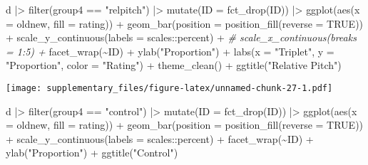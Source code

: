 \documentclass[
  man,floatsintext]{apa7}
\newenvironment{Shaded}{\begin{snugshade}}{\end{snugshade}}
\newcommand{\AttributeTok}[1]{\textcolor[rgb]{0.77,0.63,0.00}{#1}}
\newcommand{\CommentTok}[1]{\textcolor[rgb]{0.56,0.35,0.01}{\textit{#1}}}
\newcommand{\ConstantTok}[1]{\textcolor[rgb]{0.00,0.00,0.00}{#1}}
\newcommand{\FunctionTok}[1]{\textcolor[rgb]{0.00,0.00,0.00}{#1}}
\newcommand{\NormalTok}[1]{#1}
\newcommand{\SpecialCharTok}[1]{\textcolor[rgb]{0.00,0.00,0.00}{#1}}
\newcommand{\StringTok}[1]{\textcolor[rgb]{0.31,0.60,0.02}{#1}}
\begin{document}
\begin{Shaded}
\begin{Highlighting}[]
\NormalTok{d }\SpecialCharTok{|\textgreater{}}
  \FunctionTok{filter}\NormalTok{(group4 }\SpecialCharTok{==} \StringTok{"relpitch"}\NormalTok{) }\SpecialCharTok{|\textgreater{}}
  \FunctionTok{mutate}\NormalTok{(}\AttributeTok{ID =} \FunctionTok{fct\_drop}\NormalTok{(ID)) }\SpecialCharTok{|\textgreater{}}
  \FunctionTok{ggplot}\NormalTok{(}\FunctionTok{aes}\NormalTok{(}\AttributeTok{x =}\NormalTok{ oldnew, }\AttributeTok{fill =}\NormalTok{ rating)) }\SpecialCharTok{+}
  \FunctionTok{geom\_bar}\NormalTok{(}\AttributeTok{position =} \FunctionTok{position\_fill}\NormalTok{(}\AttributeTok{reverse =} \ConstantTok{TRUE}\NormalTok{)) }\SpecialCharTok{+}
  \FunctionTok{scale\_y\_continuous}\NormalTok{(}\AttributeTok{labels =}\NormalTok{ scales}\SpecialCharTok{::}\NormalTok{percent) }\SpecialCharTok{+}
  \CommentTok{\# scale\_x\_continuous(breaks = 1:5) +}
  \FunctionTok{facet\_wrap}\NormalTok{(}\SpecialCharTok{\textasciitilde{}}\NormalTok{ID) }\SpecialCharTok{+}
  \FunctionTok{ylab}\NormalTok{(}\StringTok{"Proportion"}\NormalTok{) }\SpecialCharTok{+}
  \FunctionTok{labs}\NormalTok{(}\AttributeTok{x =} \StringTok{"Triplet"}\NormalTok{, }\AttributeTok{y =} \StringTok{"Proportion"}\NormalTok{, }\AttributeTok{color =} \StringTok{"Rating"}\NormalTok{) }\SpecialCharTok{+}
  \FunctionTok{theme\_clean}\NormalTok{() }\SpecialCharTok{+}
  \FunctionTok{ggtitle}\NormalTok{(}\StringTok{"Relative Pitch"}\NormalTok{)}
\end{Highlighting}
\end{Shaded}

\texttt{[image: supplementary\_files/figure-latex/unnamed-chunk-27-1.pdf]}

\begin{Shaded}
\begin{Highlighting}[]
\NormalTok{d }\SpecialCharTok{|\textgreater{}}
  \FunctionTok{filter}\NormalTok{(group4 }\SpecialCharTok{==} \StringTok{"control"}\NormalTok{) }\SpecialCharTok{|\textgreater{}}
  \FunctionTok{mutate}\NormalTok{(}\AttributeTok{ID =} \FunctionTok{fct\_drop}\NormalTok{(ID)) }\SpecialCharTok{|\textgreater{}}
  \FunctionTok{ggplot}\NormalTok{(}\FunctionTok{aes}\NormalTok{(}\AttributeTok{x =}\NormalTok{ oldnew, }\AttributeTok{fill =}\NormalTok{ rating)) }\SpecialCharTok{+}
  \FunctionTok{geom\_bar}\NormalTok{(}\AttributeTok{position =} \FunctionTok{position\_fill}\NormalTok{(}\AttributeTok{reverse =} \ConstantTok{TRUE}\NormalTok{)) }\SpecialCharTok{+}
  \FunctionTok{scale\_y\_continuous}\NormalTok{(}\AttributeTok{labels =}\NormalTok{ scales}\SpecialCharTok{::}\NormalTok{percent) }\SpecialCharTok{+}
  \FunctionTok{facet\_wrap}\NormalTok{(}\SpecialCharTok{\textasciitilde{}}\NormalTok{ID) }\SpecialCharTok{+}
  \FunctionTok{ylab}\NormalTok{(}\StringTok{"Proportion"}\NormalTok{) }\SpecialCharTok{+}
  \FunctionTok{ggtitle}\NormalTok{(}\StringTok{"Control"}\NormalTok{)}
\end{Highlighting}
\end{Shaded}
\end{document}
